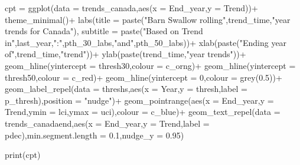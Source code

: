 \documentclass[
]{book}
\newenvironment{Shaded}{\begin{snugshade}}{\end{snugshade}}
\newcommand{\AttributeTok}[1]{\textcolor[rgb]{0.77,0.63,0.00}{#1}}
\newcommand{\DecValTok}[1]{\textcolor[rgb]{0.00,0.00,0.81}{#1}}
\newcommand{\FloatTok}[1]{\textcolor[rgb]{0.00,0.00,0.81}{#1}}
\newcommand{\FunctionTok}[1]{\textcolor[rgb]{0.00,0.00,0.00}{#1}}
\newcommand{\NormalTok}[1]{#1}
\newcommand{\OtherTok}[1]{\textcolor[rgb]{0.56,0.35,0.01}{#1}}
\newcommand{\SpecialCharTok}[1]{\textcolor[rgb]{0.00,0.00,0.00}{#1}}
\newcommand{\StringTok}[1]{\textcolor[rgb]{0.31,0.60,0.02}{#1}}
\begin{document}
\begin{Shaded}
\begin{Highlighting}[]
      
\NormalTok{    cpt }\OtherTok{=} \FunctionTok{ggplot}\NormalTok{(}\AttributeTok{data =}\NormalTok{ trends\_canada,}\FunctionTok{aes}\NormalTok{(}\AttributeTok{x =}\NormalTok{ End\_year,}\AttributeTok{y =}\NormalTok{ Trend))}\SpecialCharTok{+}
      \FunctionTok{theme\_minimal}\NormalTok{()}\SpecialCharTok{+}
      \FunctionTok{labs}\NormalTok{(}\AttributeTok{title =} \FunctionTok{paste}\NormalTok{(}\StringTok{"Barn Swallow rolling"}\NormalTok{,trend\_time,}\StringTok{"year trends for Canada"}\NormalTok{),}
           \AttributeTok{subtitle =} \FunctionTok{paste}\NormalTok{(}\StringTok{"Based on Trend in"}\NormalTok{,last\_year,}\StringTok{":"}\NormalTok{,pth\_30\_labs,}\StringTok{"and"}\NormalTok{,pth\_50\_labs))}\SpecialCharTok{+}
           \FunctionTok{xlab}\NormalTok{(}\FunctionTok{paste}\NormalTok{(}\StringTok{"Ending year of"}\NormalTok{,trend\_time,}\StringTok{"trend"}\NormalTok{))}\SpecialCharTok{+}
           \FunctionTok{ylab}\NormalTok{(}\FunctionTok{paste}\NormalTok{(trend\_time,}\StringTok{"year trends"}\NormalTok{))}\SpecialCharTok{+}
      \FunctionTok{geom\_hline}\NormalTok{(}\AttributeTok{yintercept =}\NormalTok{ thresh30,}\AttributeTok{colour =}\NormalTok{ c\_orng)}\SpecialCharTok{+}
      \FunctionTok{geom\_hline}\NormalTok{(}\AttributeTok{yintercept =}\NormalTok{ thresh50,}\AttributeTok{colour =}\NormalTok{ c\_red)}\SpecialCharTok{+}
      \FunctionTok{geom\_hline}\NormalTok{(}\AttributeTok{yintercept =} \DecValTok{0}\NormalTok{,}\AttributeTok{colour =} \FunctionTok{grey}\NormalTok{(}\FloatTok{0.5}\NormalTok{))}\SpecialCharTok{+}
      \FunctionTok{geom\_label\_repel}\NormalTok{(}\AttributeTok{data =}\NormalTok{ threshs,}\FunctionTok{aes}\NormalTok{(}\AttributeTok{x =}\NormalTok{ Year,}\AttributeTok{y =}\NormalTok{ thresh,}\AttributeTok{label =}\NormalTok{ p\_thresh),}\AttributeTok{position =} \StringTok{"nudge"}\NormalTok{)}\SpecialCharTok{+}
      \FunctionTok{geom\_pointrange}\NormalTok{(}\FunctionTok{aes}\NormalTok{(}\AttributeTok{x =}\NormalTok{ End\_year,}\AttributeTok{y =}\NormalTok{ Trend,}\AttributeTok{ymin =}\NormalTok{ lci,}\AttributeTok{ymax =}\NormalTok{ uci),}\AttributeTok{colour =}\NormalTok{ c\_blue)}\SpecialCharTok{+}
      \FunctionTok{geom\_text\_repel}\NormalTok{(}\AttributeTok{data =}\NormalTok{ trends\_canadaend,}\FunctionTok{aes}\NormalTok{(}\AttributeTok{x =}\NormalTok{ End\_year,}\AttributeTok{y =}\NormalTok{ Trend,}\AttributeTok{label =}\NormalTok{ pdec),}\AttributeTok{min.segment.length =} \FloatTok{0.1}\NormalTok{,}\AttributeTok{nudge\_y =} \FloatTok{0.95}\NormalTok{)}

      
      

  \FunctionTok{print}\NormalTok{(cpt)}
 
\end{Highlighting}
\end{Shaded}
\end{document}
